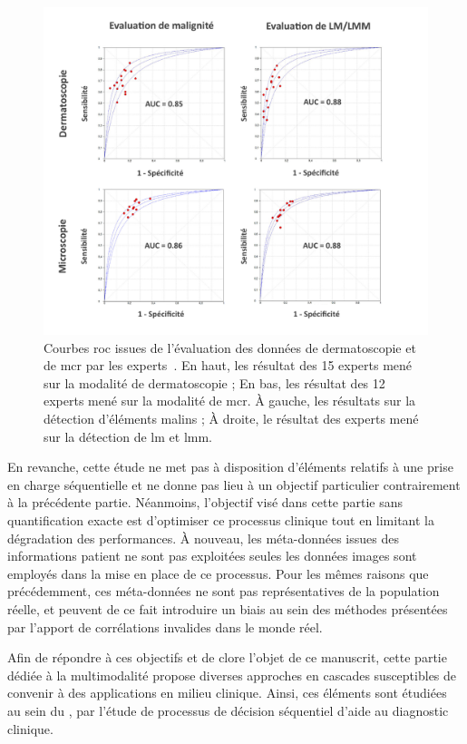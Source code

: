 \begin{figure}[H]
    \begin{center}
        \includegraphics[width=\linewidth]{contents/iii_preamble_multimodal/resources/results_roc_experts.pdf}
        \caption{Courbes \gls{roc} issues de l'évaluation des données de dermatoscopie et de \gls{mcr} par les experts~\cite{Cinotti2018}. En haut, les résultat des 15 experts mené sur la modalité de dermatoscopie ; En bas, les résultat des 12 experts mené sur la modalité de \gls{mcr}. À gauche, les résultats sur la détection d'éléments malins ; À droite, le résultat des experts mené sur la détection de \gls{lm} et \gls{lmm}.}
        \label{fig:results_roc_experts}
    \end{center} 
\end{figure}\par

En revanche, cette étude ne met pas à disposition d'éléments relatifs à une prise en charge séquentielle et ne donne pas lieu à un objectif particulier contrairement à la précédente partie. Néanmoins, l'objectif visé dans cette partie sans quantification exacte est d'optimiser ce processus clinique tout en limitant la dégradation des performances. À nouveau, les méta-données issues des informations patient ne sont pas exploitées seules les données images sont employés dans la mise en place de ce processus. Pour les mêmes raisons que précédemment, ces méta-données ne sont pas représentatives de la population réelle, et peuvent de ce fait introduire un biais au sein des méthodes présentées par l'apport de corrélations invalides dans le monde réel.\par

Afin de répondre à ces objectifs et de clore l'objet de ce manuscrit, cette partie dédiée à la multimodalité propose diverses approches en cascades susceptibles de convenir à des applications en milieu clinique. Ainsi, ces éléments sont étudiées au sein du , par l'étude de processus de décision séquentiel d'aide au diagnostic clinique.\par
